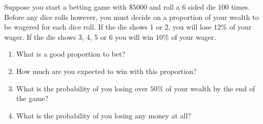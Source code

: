 Suppose you start a betting game with $\$5000$ and roll a 6 sided die 100 times. Before any dice rolls however, you must decide on a proportion of your wealth to be wagered for each dice roll. If the die shows 1 or 2, you will lose $12\%$ of your wager. If the die shows 3, 4, 5 or 6 you will win $10\%$ of your wager.

\begin{enumerate}[label=(\alph*)]
    \item What is a good proportion to bet?
    \item How much are you expected to win with this proportion?
    \item What is the probability of you losing over $50\%$ of your wealth by the end of the game?
    \item What is the probability of you losing any money at all?
\end{enumerate}

\smallspace
